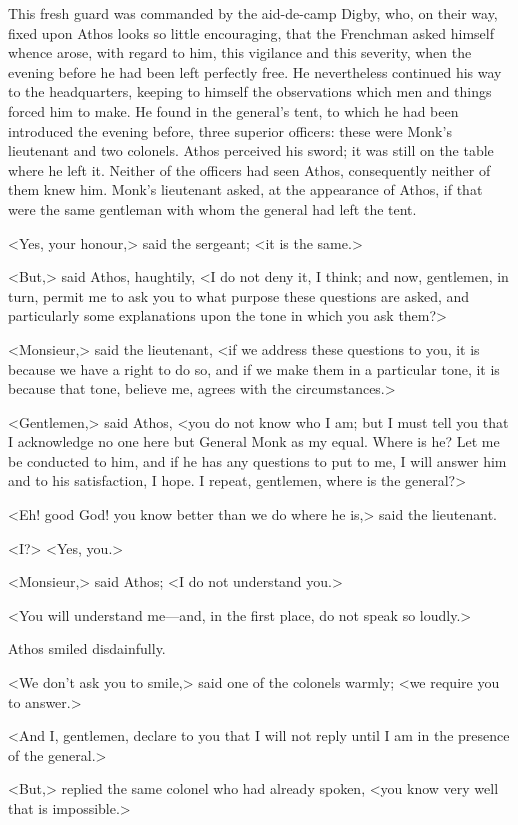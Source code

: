 This fresh guard was commanded by the aid-de-camp Digby, who, on their way, fixed upon Athos looks so little encouraging, that the Frenchman asked himself whence arose, with regard to him, this vigilance and this severity, when the evening before he had been left perfectly free. He nevertheless continued his way to the headquarters, keeping to himself the observations which men and things forced him to make. He found in the general's tent, to which he had been introduced the evening before, three superior officers: these were Monk's lieutenant and two colonels. Athos perceived his sword; it was still on the table where he left it. Neither of the officers had seen Athos, consequently neither of them knew him. Monk's lieutenant asked, at the appearance of Athos, if that were the same gentleman with whom the general had left the tent.

<Yes, your honour,> said the sergeant; <it is the same.>

<But,> said Athos, haughtily, <I do not deny it, I think; and now, gentlemen, in turn, permit me to ask you to what purpose these questions are asked, and particularly some explanations upon the tone in which you ask them?>

<Monsieur,> said the lieutenant, <if we address these questions to you, it is because we have a right to do so, and if we make them in a particular tone, it is because that tone, believe me, agrees with the circumstances.>

<Gentlemen,> said Athos, <you do not know who I am; but I must tell you that I acknowledge no one here but General Monk as my equal. Where is he? Let me be conducted to him, and if he has any questions to put to me, I will answer him and to his satisfaction, I hope. I repeat, gentlemen, where is the general?>

<Eh! good God! you know better than we do where he is,> said the lieutenant.

<I\@?> <Yes, you.>

<Monsieur,> said Athos; <I do not understand you.>

<You will understand me—and, in the first place, do not speak so loudly.>

Athos smiled disdainfully.

<We don't ask you to smile,> said one of the colonels warmly; <we require you to answer.>

<And I, gentlemen, declare to you that I will not reply until I am in the presence of the general.>

<But,> replied the same colonel who had already spoken, <you know very well that is impossible.>

